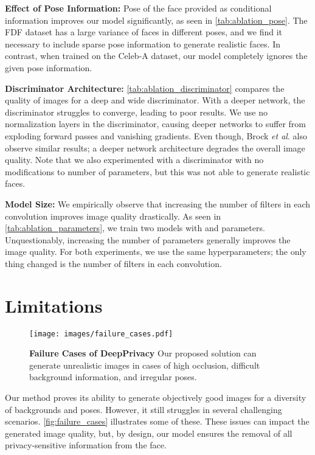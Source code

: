 \documentclass[runningheads]{llncs}
\newcommand{\etal}{\textit{et al}. }
\begin{document}
\textbf{Effect of Pose Information:}
Pose of the face provided as conditional information improves our model significantly, as seen in \autoref{tab:ablation_pose}. The FDF dataset has a large variance of faces in different poses, and we find it necessary to include sparse pose information to generate realistic faces.
In contrast, when trained on the Celeb-A dataset, our model completely ignores the given pose information.

\textbf{Discriminator Architecture:}
\autoref{tab:ablation_discriminator} compares the quality of images for a deep and wide discriminator. With a deeper network, the discriminator struggles to converge, leading to poor results. We use no normalization layers in the discriminator, causing deeper networks to suffer from exploding forward passes and vanishing gradients.
Even though, Brock \etal \cite{Brock2018} also observe  similar results; a deeper network architecture degrades the overall image quality.
Note that we also experimented with a discriminator with no modifications to number of parameters, but this was not able to generate realistic faces.

\textbf{Model Size:}
We empirically observe that increasing the number of filters in each convolution improves image quality drastically. 
As seen in \autoref{tab:ablation_parameters}, we train two models with  and  parameters. Unquestionably, increasing the number of parameters generally improves the image quality. For both experiments, we use the same hyperparameters; the only thing changed is the number of filters in each convolution. 

 \section{Limitations}

\begin{figure}
    \centering
    \texttt{[image: images/failure\_cases.pdf]}
    \caption{\textbf{Failure Cases of DeepPrivacy} Our proposed solution can generate unrealistic images in cases of high occlusion, difficult background information, and irregular poses. }
    \label{fig:failure_cases}
\end{figure}

Our method proves its ability to generate objectively good images for a diversity of backgrounds and poses. However, it still struggles in several challenging scenarios. \autoref{fig:failure_cases} illustrates some of these. 
These issues can impact the generated image quality, but, by design, our model ensures the removal of all privacy-sensitive information from the face.  
\end{document}
